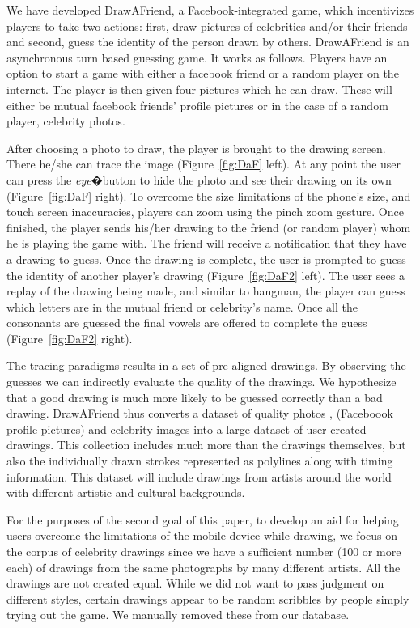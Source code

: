 We have developed DrawAFriend, a Facebook-integrated game, which incentivizes players to take two actions: first, draw pictures of celebrities and/or their friends and second, guess the identity of the person drawn by others. DrawAFriend is an asynchronous turn based guessing game. It works as follows. Players have an option to start a game with either a facebook friend or a random player on the internet. The player is then given four pictures which he can draw. These will either be mutual facebook friends' profile pictures or in the case of a random player, celebrity photos.

After choosing a photo to draw, the player is brought to the drawing screen. There he/she can trace the image (Figure~\ref{fig:DaF} left). At any point the user can press the {\em eye}�button to hide the photo and see their drawing on its own (Figure~\ref{fig:DaF} right). To overcome the size limitations of the phone's size, and touch screen inaccuracies, players can zoom using the pinch zoom gesture.
Once finished, the player sends his/her drawing to the friend (or random player) whom he is playing the game with. The friend will receive a notification that they have a drawing to guess. Once the drawing is complete, the user is prompted to guess the identity of another player's drawing (Figure~\ref{fig:DaF2} left). The user sees a replay of the drawing being made, and similar to hangman, the player can guess which letters are in the mutual friend or celebrity's name. Once all the consonants are guessed the final vowels are offered to complete the guess (Figure~\ref{fig:DaF2} right).

The tracing paradigms results in a set of pre-aligned drawings. By observing the guesses we can indirectly evaluate the quality of the drawings. We hypothesize that a good drawing is much more likely to be guessed correctly than a bad drawing. DrawAFriend thus converts a dataset of quality photos , (Faceboook profile pictures) and celebrity images into a large dataset of user created drawings. This collection includes much more than the drawings themselves, but also the individually drawn strokes represented as polylines along with timing information. This dataset will include drawings from artists around the world with different artistic and cultural backgrounds.

For the purposes of the second goal of this paper, to develop an aid for helping users overcome the limitations of the mobile device while drawing, we focus on the corpus of celebrity drawings since we have a sufficient number (100 or more each) of drawings from the same photographs by many different artists. All the drawings are not created equal. While we did not want to pass judgment on different styles, certain drawings appear to be random scribbles by people simply trying out the game. We manually removed these from our database. 

